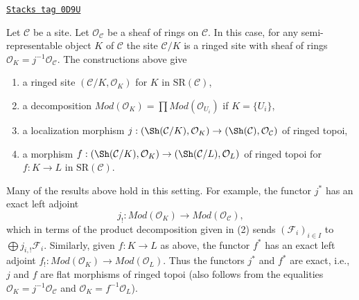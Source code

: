 \begin{remark}

\label{spaces-simplicial-remark-semi-representable-ringed}
\href{https://stacks.math.columbia.edu/tag/0D9U}{\texttt{Stacks tag 0D9U}}

Let $\mathcal{C}$ be a site. Let $\mathcal{O}_\mathcal{C}$
be a sheaf of rings on $\mathcal{C}$. In this case, for any
semi-representable object $K$ of $\mathcal{C}$ the site
$\mathcal{C}/K$ is a ringed site with sheaf
of rings $\mathcal{O}_K = j^{-1}\mathcal{O}_\mathcal{C}$.
The constructions above give
\begin{enumerate}
\item a ringed site $(\mathcal{C}/K, \mathcal{O}_K)$
for $K$ in $\text{SR}(\mathcal{C})$,
\item a decomposition
$\textit{Mod}(\mathcal{O}_K) =
\prod \textit{Mod}(\mathcal{O}_{U_i})$ if $K = \{U_i\}$,
\item a localization morphism
$j : (\Sh(\mathcal{C}/K), \mathcal{O}_K) \to
(\Sh(\mathcal{C}), \mathcal{O}_\mathcal{C})$
of ringed topoi,
\item a morphism
$f : (\Sh(\mathcal{C}/K), \mathcal{O}_K) \to
(\Sh(\mathcal{C}/L), \mathcal{O}_L)$ of ringed topoi
for $f : K \to L$ in $\text{SR}(\mathcal{C})$.
\end{enumerate}
Many of the results above hold in this setting. For example, the
functor $j^*$ has an exact left adjoint
$$
j_! : \textit{Mod}(\mathcal{O}_K) \to \textit{Mod}(\mathcal{O}_\mathcal{C}),
$$
which in terms of the product decomposition given in (2) sends
$(\mathcal{F}_i)_{i \in I}$ to $\bigoplus j_{i, !}\mathcal{F}_i$.
Similarly, given $f : K \to L$ as above, the functor $f^*$ has
an exact left adjoint
$f_! : \textit{Mod}(\mathcal{O}_K) \to \textit{Mod}(\mathcal{O}_L)$.
Thus the functors $j^*$ and $f^*$ are exact, i.e.,
$j$ and $f$ are flat morphisms of ringed topoi (also follows
from the equalities $\mathcal{O}_K = j^{-1}\mathcal{O}_\mathcal{C}$
and $\mathcal{O}_K = f^{-1}\mathcal{O}_L$).
\end{remark}

